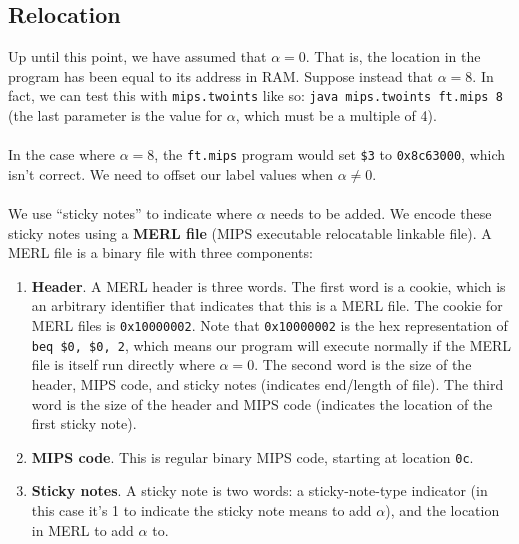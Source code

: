 \documentclass[]{article}
\theoremstyle{definition}
\begin{document}
		\subsection{Relocation}
			Up until this point, we have assumed that $\alpha = 0$. That is, the location in the program has been equal to its address in RAM. Suppose instead that $\alpha = 8$. In fact, we can test this with \verb+mips.twoints+ like so: \verb+java mips.twoints ft.mips 8+ (the last parameter is the value for $\alpha$, which must be a multiple of 4).
			\\ \\
			In the case where $\alpha = 8$, the \verb+ft.mips+ program would set \verb+$3+ to \verb+0x8c63000+, which isn't correct. We need to offset our label values when $\alpha \not = 0$.
			\\ \\
			We use ``sticky notes'' to indicate where $\alpha$ needs to be added. We encode these sticky notes using a \textbf{MERL file} (MIPS executable relocatable linkable file). A MERL file is a binary file with three components:
			\begin{enumerate}
				\item \textbf{Header}. A MERL header is three words. The first word is a cookie, which is an arbitrary identifier that indicates that this is a MERL file. The cookie for MERL files is \verb+0x10000002+. Note that \verb+0x10000002+ is the hex representation of \verb+beq $0, $0, 2+, which means our program will execute normally if the MERL file is itself run directly where $\alpha = 0$. The second word is the size of the header, MIPS code, and sticky notes (indicates end/length of file). The third word is the size of the header and MIPS code (indicates the location of the first sticky note).
				\item \textbf{MIPS code}. This is regular binary MIPS code, starting at location \verb+0c+.
				\item \textbf{Sticky notes}. A sticky note is two words: a sticky-note-type indicator (in this case it's 1 to indicate the sticky note means to add $\alpha$), and the location in MERL to add $\alpha$ to.
			\end{enumerate}
\end{document}
